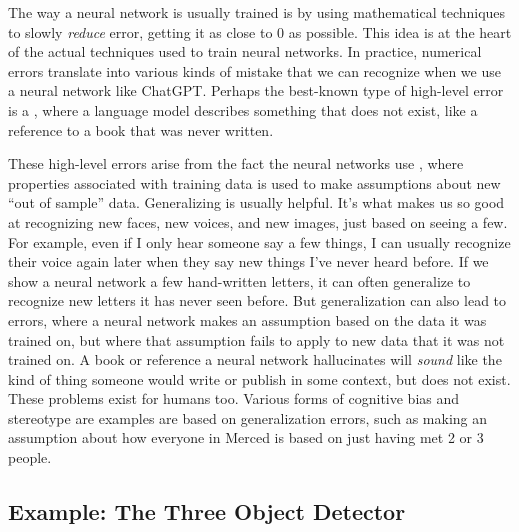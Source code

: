The way a neural network is usually trained is by using mathematical techniques to slowly \emph{reduce} error, getting it as close to 0 as possible. This idea is at the heart of the actual techniques used to train neural networks. In practice, numerical errors translate into various kinds of mistake that we can recognize when we use a neural network like ChatGPT.  Perhaps the best-known type of high-level error is a  , where a language model describes something that does not exist, like a reference to a book that was never written. 

These high-level errors arise from the fact the neural networks use , where properties associated with training data is used to make assumptions about new ``out of sample'' data. Generalizing is usually helpful. It's what makes us so good at recognizing new faces, new voices, and new images, just based on seeing a few.  For example, even if I only hear someone say a few things, I can usually recognize their voice again later when they say new things I've never heard before. If we show a neural network a few hand-written letters, it can often generalize to recognize new letters it has never seen before.  But generalization can also lead to errors, where a neural network makes an assumption based on the data it was trained on, but where that assumption fails to apply to new data that it was not trained on. A book or reference a neural network hallucinates will \emph{sound} like the kind of thing someone would write or publish in some context, but does not exist. These problems exist for humans too. Various forms of cognitive bias and stereotype are examples are based on generalization errors, such as making an assumption about how everyone in Merced is based on just having met 2 or 3 people.

\subsection{Example: The Three Object Detector}

